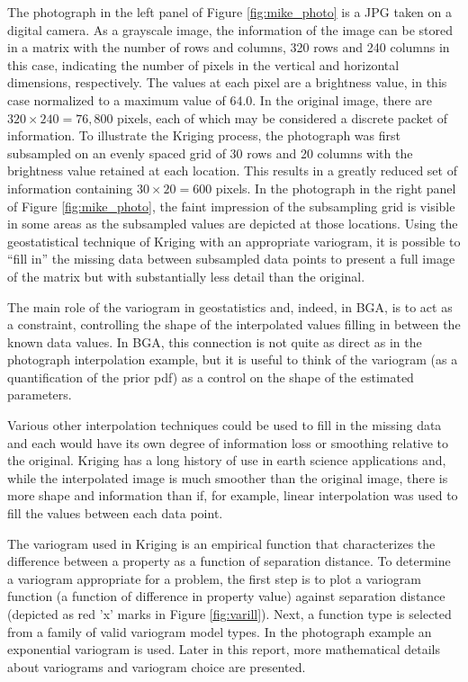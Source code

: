\documentclass[11pt,oneside,onecolumn]{usgsreport}
\begin{document}
\begin{multicols}{2}
The photograph in the left panel of Figure \ref{fig:mike_photo} is
a JPG taken on a digital camera. As a grayscale image, the information
of the image can be stored in a matrix with the number of rows and
columns, 320 rows and 240 columns in this case, indicating the number
of pixels in the vertical and horizontal dimensions, respectively.
The values at each pixel are a brightness value, in this case normalized
to a maximum value of 64.0. In the original image, there are $320\times240=76,800$
pixels, each of which may be considered a discrete packet of information.
To illustrate the Kriging process, the photograph was first subsampled
on an evenly spaced grid of 30 rows and 20 columns with the brightness
value retained at each location. This results in a greatly reduced
set of information containing $30\times20=600$ pixels. In the photograph
in the right panel of Figure \ref{fig:mike_photo}, the faint impression
of the subsampling grid is visible in some areas as the subsampled
values are depicted at those locations. Using the geostatistical technique
of Kriging with an appropriate variogram, it is possible to ``fill
in'' the missing data between subsampled data points to present a
full image of the matrix but with substantially less detail than the
original. 

The main role of the variogram in geostatistics and, indeed, in BGA,
is to act as a constraint, controlling the shape of the interpolated
values filling in between the known data values. In BGA, this connection
is not quite as direct as in the photograph interpolation example,
but it is useful to think of the variogram (as a quantification of
the prior pdf) as a control on the shape of the estimated parameters. 

Various other interpolation techniques could be used to fill in the
missing data and each would have its own degree of information loss
or smoothing relative to the original. Kriging has a long history
of use in earth science applications and, while the interpolated image
is much smoother than the original image, there is more shape and
information than if, for example, linear interpolation was used to
fill the values between each data point.

The variogram used in Kriging is an empirical function that characterizes
the difference between a property as a function of separation distance.
To determine a variogram appropriate for a problem, the first step
is to plot a variogram function (a function of difference in property
value) against separation distance (depicted as red 'x' marks in Figure
\ref{fig:varill}). Next, a function type is selected from a family
of valid variogram model types. In the photograph example an exponential
variogram is used. Later in this report, more mathematical details
about variograms and variogram choice are presented.


\end{multicols}
\end{document}
